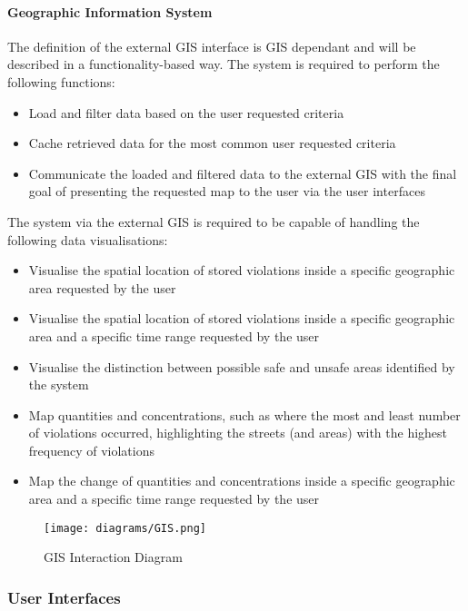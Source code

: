 \paragraph{Geographic Information System} \label{p:gis} The definition of the external GIS interface is GIS dependant and will be described in a functionality-based way. The system is required to perform the following functions:

	\begin{itemize}
		\item Load and filter data based on the user requested criteria
		\item Cache retrieved data for the most common user requested criteria
		\item Communicate the loaded and filtered data to the external GIS with the final goal of presenting the requested map to the user via the user interfaces
		
		\end{itemize}
The system via the external GIS is required to be capable of handling the following data visualisations:
	
	\begin{itemize}
		\item Visualise the spatial location of stored violations inside a specific geographic area requested by the user
		\item Visualise the spatial location of stored violations inside a specific geographic area and a specific time range requested by the user
		\item Visualise the distinction between possible safe and unsafe areas identified by the system
		\item Map quantities and concentrations, such as where the most and least number of violations occurred, highlighting the streets (and areas) with the highest frequency of violations
		\item Map the change of quantities and concentrations inside a specific geographic area and a specific time range requested by the user \newline
	\end{itemize}

	\begin{figure}[h]
		\centering
		\texttt{[image: diagrams/GIS.png]}
		\caption{
			\label{fig:externalGIS} GIS Interaction Diagram}
	\end{figure}

\clearpage
\subsubsection{User Interfaces}

